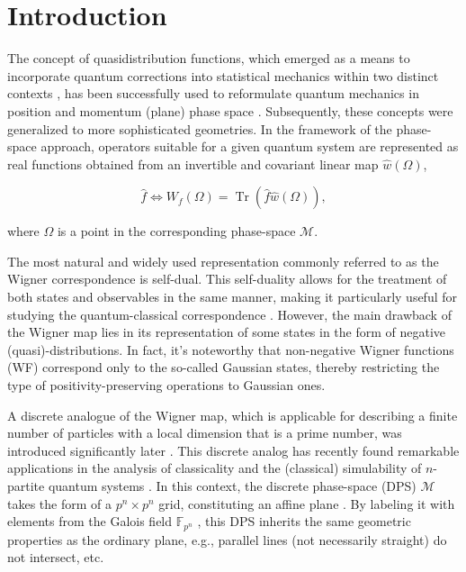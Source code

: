 \documentclass[quantumrep,article,submit,pdftex,moreauthors]{Definitions/mdpi}
\DeclareMathOperator{\Tr}{Tr}
\begin{document}
\section{Introduction}

The concept of quasidistribution functions, which emerged as a means to
incorporate quantum corrections into statistical mechanics within two distinct
contexts \cite{wigner,bloch}, has been successfully used to reformulate quantum
mechanics in position and momentum (plane) phase space \cite{groenewold,moyal}.
Subsequently, these concepts were generalized to more sophisticated geometries.
In the framework of the phase-space approach, operators suitable for a given
quantum system are represented as real functions obtained from an invertible and
covariant linear map $\hat{w}(\Omega)$,

\begin{equation*}
  \hat{f}\Leftrightarrow W_{f}(\Omega)
  = \Tr\left(\hat{f}\hat{w}(\Omega)\right),
\end{equation*}

where $\Omega$ is a point in the corresponding phase-space $\mathcal{M}$.

The most natural and widely used representation
\cite{qoptics,electron1,electron2} commonly referred to as the Wigner
correspondence \cite{wigner} is self-dual. This self-duality allows for the
treatment of both states and observables in the same manner, making it
particularly useful for studying the quantum-classical correspondence
\cite{berry}. However, the main drawback of the Wigner map lies in its
representation of some states in the form of negative (quasi)-distributions. In
fact, it's noteworthy that non-negative Wigner functions (WF) correspond only to
the so-called Gaussian states, thereby restricting the type of
positivity-preserving operations to Gaussian ones.

A discrete analogue of the Wigner map, which is applicable for describing a
finite number of particles with a local dimension that is a prime number,
was introduced significantly later \cite{spin1, spin2,wootters1,gibbons}.
This discrete analog has recently found remarkable applications in the
analysis of classicality and the (classical) simulability of $n$-partite
quantum systems \cite{gottKnill, galvao, cormick, gross,WignerNegResource,
Raus17, UniqueWF, cohomo}. In this context, the discrete phase-space (DPS)
$\mathcal{M}$ takes the form of a $p^{n}\times p^{n}$ grid, constituting an
affine plane \cite{Saniga2004}. By labeling it with elements from the Galois
field $\mathbb{F}_{p^{n}}$ , this DPS inherits the same geometric properties as
the ordinary plane, e.g., parallel lines (not necessarily straight) do not
intersect, etc.
\end{document}
